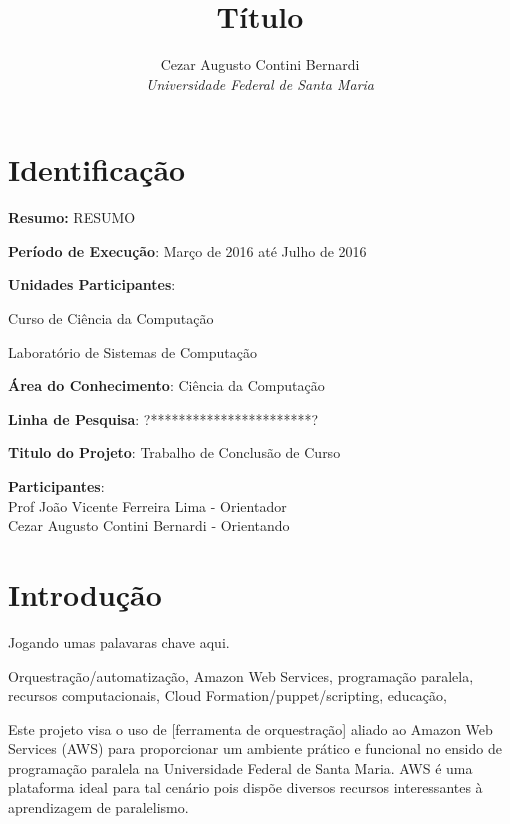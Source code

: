 \documentclass[12pt]{article}
\title{Título}
\author{Cezar Augusto Contini Bernardi \\ \emph{Universidade Federal de Santa Maria}}
\begin{document}
\maketitle


\section{Identificação}

\begin{description} \itemsep 0pt

\item{\textbf{Resumo:}} RESUMO


\item{\textbf{Período de Execução}}: Março de 2016 até Julho de 2016

\item{\textbf{Unidades Participantes}}: 

    Curso de Ciência da Computação
    
    Laboratório de Sistemas de Computação
    
    
\item{\textbf{Área do Conhecimento}}: Ciência da Computação

\item{\textbf{Linha de Pesquisa}}: ?***********************?

\item{\textbf{Titulo do Projeto}}: Trabalho de Conclusão de Curso

\item{\textbf{Participantes}}:
\\Prof João Vicente Ferreira Lima - Orientador
\\Cezar Augusto Contini Bernardi - Orientando 
\end{description}


\section{Introdução}

Jogando umas palavaras chave aqui.

Orquestração/automatização, Amazon Web Services, programação paralela, recursos computacionais, Cloud Formation/puppet/scripting, educação, 

Este projeto visa o uso de [ferramenta de orquestração] aliado ao Amazon Web Services (AWS) para proporcionar um ambiente prático e funcional no ensido de programação paralela na Universidade Federal de Santa Maria. AWS é uma plataforma ideal para tal cenário pois dispõe diversos recursos interessantes à aprendizagem de paralelismo.
\end{document}
